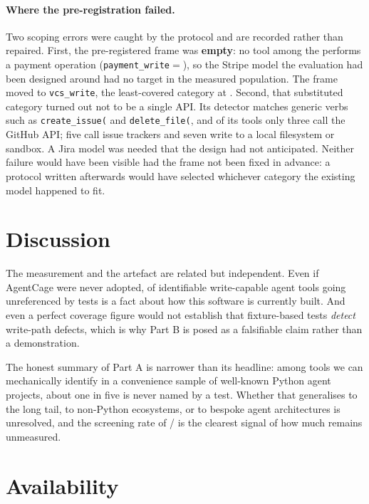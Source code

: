 \documentclass[11pt]{article}
\begin{document}
\paragraph{Where the pre-registration failed.} Two scoping errors were caught by the
protocol and are recorded rather than repaired. First, the pre-registered frame was
\textbf{empty}: no tool among the \AcTools{} performs a payment operation
(\texttt{payment\_write}${}={}$\AcPaymentN{}), so the Stripe model the evaluation had
been designed around had no target in the measured population. The frame moved to
\texttt{vcs\_write}, the least-covered category at \AcVcsPct{}. Second, that substituted
category turned out not to be a single API. Its detector matches generic verbs such as
\texttt{create\_issue(} and \texttt{delete\_file(}, and of its \AcVcsN{} tools only three
call the GitHub API; five call issue trackers and seven write to a local filesystem or
sandbox. A Jira model was needed that the design had not anticipated. Neither failure
would have been visible had the frame not been fixed in advance: a protocol written
afterwards would have selected whichever category the existing model happened to fit.

\section{Discussion}

The measurement and the artefact are related but independent. Even if AgentCage were
never adopted, \AcUncoveredPct{} of identifiable write-capable agent tools going
unreferenced by tests is a fact about how this software is currently built. And even a
perfect coverage figure would not establish that fixture-based tests \emph{detect}
write-path defects, which is why Part B is posed as a falsifiable claim rather than a
demonstration.

The honest summary of Part A is narrower than its headline: among tools we can
mechanically identify in a convenience sample of well-known Python agent projects, about
one in five is never named by a test. Whether that generalises to the long tail, to
non-Python ecosystems, or to bespoke agent architectures is unresolved, and the
screening rate of \AcScreenedOut{}/\AcCandidates{} is the clearest signal of how much
remains unmeasured.

\section{Availability}
\end{document}
